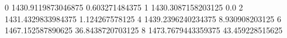 0 1430.9119873046875 0.603271484375
1 1430.3087158203125 0.0
2 1431.4329833984375 1.124267578125
4 1439.2396240234375 8.930908203125
6 1467.152587890625 36.8438720703125
8 1473.7679443359375 43.459228515625
